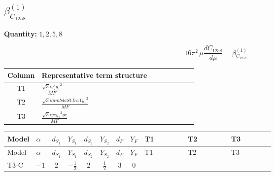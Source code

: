\documentclass[8pt]{article}
\begin{document}
\begin{landscape}
\section*{$\beta_{C_{1258}}^{(1)}$}
\noindent\textbf{Quantity: }$\mathrm{1,2,5,8}$\par\smallskip
\[16\pi^2\,\mu\frac{d C_{1258}}{d\mu}=\beta_{C_{1258}}^{(1)}\]
\begin{center}
\begin{tabular}{@{}c >{\raggedright\arraybackslash}p{0.82\linewidth}@{}}
\toprule
Column & Representative term structure \\
\midrule
T1 & \(\displaystyle \frac{\sqrt{3} i g_{2}^{2} \overline{y_{1}}^{2}}{MF}\) \\
\midrule
T2 & \(\displaystyle \frac{\sqrt{3} i lambdaS1Inv1 \overline{y_{1}}^{2}}{MF}\) \\
\midrule
T3 & \(\displaystyle \frac{\sqrt{3} i ye \overline{y_{1}}^{2} \overline{ye}}{MF}\) \\
\midrule
\bottomrule
\end{tabular}
\end{center}
\smallskip
\tiny
\begin{longtable}{@{}llcccccc >{\raggedright\arraybackslash}p{0.21\linewidth} >{\raggedright\arraybackslash}p{0.21\linewidth} >{\raggedright\arraybackslash}p{0.21\linewidth}@{}}
\toprule
Model & $\alpha$ & $d_{S_1}$ & $Y_{S_1}$ & $d_{S_2}$ & $Y_{S_2}$ & $d_F$ & $Y_F$ & T1 & T2 & T3 \\
\midrule
\endfirsthead
\toprule
Model & $\alpha$ & $d_{S_1}$ & $Y_{S_1}$ & $d_{S_2}$ & $Y_{S_2}$ & $d_F$ & $Y_F$ & T1 & T2 & T3 \\
\midrule
\endhead
T3-C & $-1$ & $2$ & $-\frac{1}{2}$ & $2$ & $\frac{1}{2}$ & $3$ & $0$ & \scriptsize\adjustbox{max width=\linewidth}{$\begin{gathered} \frac{\sqrt{3} i g_{2}^{2} \overline{y_{1}}^{2}}{8 MF}\end{gathered}$} & \scriptsize\adjustbox{max width=\linewidth}{$\begin{gathered} \frac{\sqrt{3} i lambdaS1Inv1 \overline{y_{1}}^{2}}{12 MF}\end{gathered}$} & \scriptsize\adjustbox{max width=\linewidth}{$\begin{gathered} - \frac{\sqrt{3} i ye \overline{y_{1}}^{2} \overline{ye}}{24 MF}\end{gathered}$} \\
\midrule
\bottomrule
\end{longtable}
\clearpage

\end{landscape}
\end{document}
